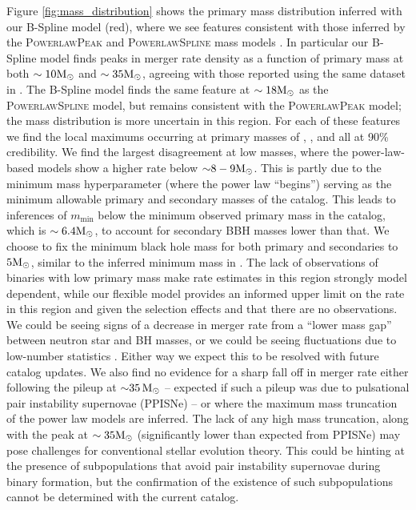 Figure \ref{fig:mass_distribution} shows the primary mass distribution inferred with our B-Spline model (red), where we see features consistent with those inferred by the \textsc{PowerlawPeak} and \textsc{PowerlawSpline} mass models \citep{Talbot_2018,o3a_pop,Edelman_2022ApJ,o3b_astro_dist,GWTC3POPDATA}. 
In particular our B-Spline model finds peaks in merger rate density as a function of primary mass at both $\sim10{\rm M}_\odot$ and $\sim35{\rm M}_\odot$, agreeing with those 
reported using the same dataset in \citet{o3b_astro_dist}.  The B-Spline model finds the same feature at $\sim18{\rm M}_\odot$ as the \textsc{PowerlawSpline} model, but remains consistent with the \textsc{PowerlawPeak} model; the mass distribution is more uncertain in this region. For each of these features we find the local maximums occurring at primary masses of \result{$\CIPlusMinus{\macros[MassDistribution][BSpline][peaks][10]}\,\msun$},  
\result{$\CIPlusMinus{\macros[MassDistribution][BSpline][peaks][18]}\,\msun$}, and  
\result{$\CIPlusMinus{\macros[MassDistribution][BSpline][peaks][35]}\,\msun$} all at 90\% credibility.
We find the largest disagreement at low masses, where the power-law-based models show a higher rate below ${\sim}8-9{\rm M}_\odot$. This is partly due to the minimum mass hyperparameter (where the power law ``begins'') serving as the minimum allowable primary and secondary masses of the catalog. This leads to inferences of $m_\mathrm{min}$ below the minimum observed primary mass in the catalog, which is $\sim 6.4{\rm M}_\odot$, to account for secondary BBH masses lower than that. We choose to fix the minimum black hole mass for both primary and secondaries to $5{\rm M}_\odot$, 
similar to the inferred minimum mass in \citet{o3b_astro_dist}. The lack of observations of binaries with low primary mass make rate estimates in this region strongly model dependent, while our flexible model provides an informed upper limit on the rate in this region and given the selection effects and that there are no observations. We could be seeing signs of a decrease in merger rate from a ``lower mass gap'' between neutron star and BH masses, or we could be seeing fluctuations due to low-number statistics \citep{NoPeaksWithoutValleys}. Either way we expect this to be resolved with future catalog updates. We also find no evidence for a sharp fall off in merger rate either following 
the pileup at ${\sim}35\,{\rm M}_\odot$ -- expected if such a pileup was due to pulsational pair instability supernovae (PPISNe) -- or where the maximum mass truncation of the power law models 
are inferred. The lack of any high mass truncation, along with the peak at $\sim35{\rm M}_\odot$ (significantly lower than expected from PPISNe) may pose challenges for conventional stellar 
evolution theory. This could be hinting at the presence of subpopulations that avoid pair instability supernovae during binary formation, but the confirmation of the existence of such subpopulations 
cannot be determined with the current catalog.


